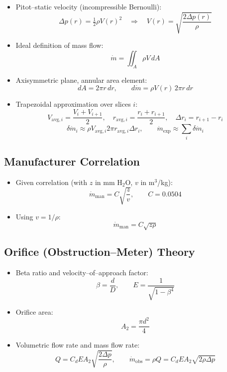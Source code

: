 \documentclass[11pt]{article}
\begin{document}
\begin{itemize}
  \item Pitot–static velocity (incompressible Bernoulli):
    $$
      \Delta p(r) = \tfrac{1}{2}\rho V(r)^2
      \quad \Rightarrow \quad
      V(r) = \sqrt{\frac{2\Delta p(r)}{\rho}}
    $$
  \item Ideal definition of mass flow:
    $$
      \dot m = \iint_A \rho V\,dA
    $$
  \item Axisymmetric plane, annular area element:
    $$
      dA = 2\pi r\,dr,
      \qquad
      d\dot m = \rho V(r)\,2\pi r\,dr
    $$
  \item Trapezoidal approximation over slices \(i\):
    $$
      V_{\text{avg},i} = \frac{V_i + V_{i+1}}{2},\quad
      r_{\text{avg},i} = \frac{r_i + r_{i+1}}{2},\quad
      \Delta r_i = r_{i+1} - r_i
    $$
    $$
      \delta \dot m_i \approx
      \rho V_{\text{avg},i} 2\pi r_{\text{avg},i} \Delta r_i,
      \qquad
      \dot m_{\text{exp}} \approx \sum_i \delta \dot m_i
    $$
\end{itemize}

\subsection*{Manufacturer Correlation}

\begin{itemize}
  \item Given correlation (with \(z\) in mm H\(_2\)O, \(v\) in m\(^3\)/kg):
    $$
      \dot m_{\text{man}} = C \sqrt{\frac{z}{v}},
      \qquad C = 0.0504
    $$
  \item Using \(v = 1/\rho\):
    $$
      \dot m_{\text{man}} = C \sqrt{z \rho}
    $$
\end{itemize}

\subsection*{Orifice (Obstruction–Meter) Theory}

\begin{itemize}
  \item Beta ratio and velocity–of–approach factor:
    $$
      \beta = \frac{d}{D},
      \qquad
      E = \frac{1}{\sqrt{1-\beta^4}}
    $$
  \item Orifice area:
    $$
      A_2 = \frac{\pi d^2}{4}
    $$
  \item Volumetric flow rate and mass flow rate:
    $$
      Q = C_d E A_2 \sqrt{\frac{2\Delta p}{\rho}},
      \qquad
      \dot m_{\text{obs}} = \rho Q
      = C_d E A_2 \sqrt{2\rho \Delta p}
    $$
\end{itemize}
\end{document}
